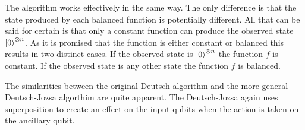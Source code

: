 % 

The algorithm works effectively in the same way.
The only difference is that the state produced by each balanced function is potentially different.
All that can be said for certain is that only a constant function can produce the observed state $\left\vert{0}\right\rangle^{\otimes{n}}$.
As it is promised that the function is either constant or balanced this results in two distinct cases.
If the observed state is $\left\vert{0}\right\rangle^{\otimes{n}}$ the function $f$ is constant.
If the observed state is any other state the function $f$ is balanced.

The similarities between the original Deutsch algorithm and the more general Deutsch-Jozsa algorthim are quite apparent.
The Deutsch-Jozsa again uses superposition to create an effect on the input qubits when the action is taken on the ancillary qubit.

